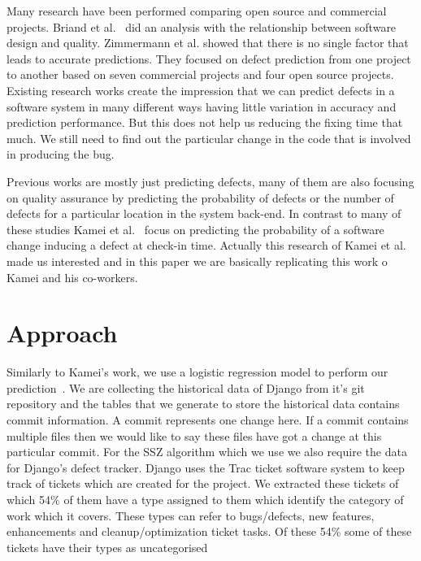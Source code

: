 \documentclass[10pt, conference]{IEEEtran}
\begin{document}
Many research have been performed comparing open source and commercial projects. Briand et al.~\cite{Briand1999ICSE} did an analysis with the relationship between software design and quality. Zimmermann et al.\cite{Zimmermann2009ESECS} showed that there is no single factor that leads to accurate predictions. They focused on defect prediction from one project to another based on seven commercial projects and four open source projects. Existing research works create the impression that we can predict defects in a software system in many different ways having little variation in accuracy and prediction performance. But this does not help us reducing the fixing time that much. We still need to find out the particular change in the code that is involved in producing the bug.

Previous works are mostly just predicting defects, many of them are also focusing on quality assurance by predicting the probability of defects or the number of defects for a particular location in the system back-end. In contrast to many of these studies Kamei et al.~\cite{Kamei2013TSE} focus on predicting the probability of a software change inducing a defect at check-in time. Actually this research of Kamei et al. made us interested and in this paper we are basically replicating this work o Kamei and his co-workers.

\section{Approach}
\label{sec:approach}



Similarly to Kamei's work, we use a logistic regression model to perform our prediction~\cite{Kamei2013TSE}. We are collecting the historical data of Django from it's git repository and the tables that we generate to store the historical data contains commit information. A commit represents one change here. If a commit contains multiple files then we would like to say these files have got a change at this particular commit. For the SSZ algorithm which we use we also require the data for Django's defect tracker. Django uses the Trac ticket software system to keep track of tickets which are created for the project. We extracted these tickets of which 54\% of them have a type assigned to them which identify the category of work which it covers. These types can refer to bugs/defects, new features, enhancements and cleanup/optimization ticket tasks. Of these 54\% some of these tickets have their types as uncategorised  
\end{document}
